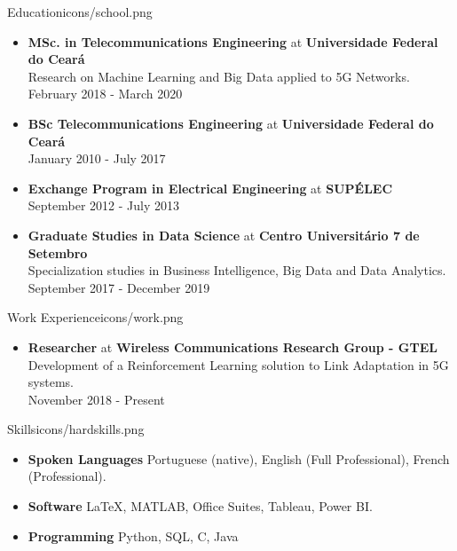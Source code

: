 \documentclass{thepurplecv}
\begin{document}
\begin{purplesectionleft}{Education}{icons/school.png}
{
\begin{itemize}[leftmargin=0cm,align=left]
    \item[] \textbf{MSc. in Telecommunications Engineering} at \textbf{Universidade Federal do Ceará}\\
    Research on Machine Learning and Big Data applied to 5G Networks. \\
    February 2018 - March 2020

    \item[] \textbf{BSc Telecommunications Engineering} at \textbf{Universidade Federal do Ceará}\\
    January 2010 - July 2017

    \item[] \textbf{Exchange Program in Electrical Engineering} at \textbf{SUPÉLEC}\\
    September 2012 - July 2013

    \item[] \textbf{Graduate Studies in Data Science} at \textbf{Centro Universitário 7 de Setembro}\\
    Specialization studies in Business Intelligence, Big Data and Data Analytics. \\
    September 2017 - December 2019
\end{itemize}
}
\end{purplesectionleft}

\begin{purplesectionright}{Work Experience}{icons/work.png}
{
\begin{itemize}[leftmargin=0cm,align=left]
    \item[] \textbf{Researcher} at \textbf{Wireless Communications Research Group - GTEL}\\
    Development of a Reinforcement Learning solution to Link Adaptation in 5G systems.\\
    November 2018 - Present
\end{itemize}
}
\end{purplesectionright}

\begin{purplesectionleft}{Skills}{icons/hardskills.png}
{
\begin{itemize}[leftmargin=0cm,align=left]
    \item[] \textbf{Spoken Languages}
    Portuguese (native), English (Full Professional), French (Professional).

    \item[] \textbf{Software}
    \LaTeX, MATLAB, Office Suites, Tableau, Power BI.

    \item[] \textbf{Programming}
    Python, SQL, C, Java

\end{itemize}
}
\end{purplesectionleft}
\end{document}
